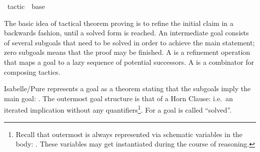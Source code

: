 %
\begin{isabellebody}%
\def\isabellecontext{tactic}%
%
\isadelimtheory
\isanewline
\isanewline
\isanewline
%
\endisadelimtheory
%
\isatagtheory
{}\isamarkupfalse%
\ tactic\ \ base\ %
\endisatagtheory
{\isafoldtheory}%
%
\isadelimtheory
%
\endisadelimtheory
%
\isamarkuptrue%
%
\begin{isamarkuptext}%
The basic idea of tactical theorem proving is to refine the initial
  claim in a backwards fashion, until a solved form is reached.  An
  intermediate goal consists of several subgoals that need to be
  solved in order to achieve the main statement; zero subgoals means
  that the proof may be finished.  A  is a refinement
  operation that maps a goal to a lazy sequence of potential
  successors.  A  is a combinator for composing
  tactics.%
\end{isamarkuptext}%
\isamarkuptrue%
%
\isamarkuptrue%
%
\begin{isamarkuptext}%
Isabelle/Pure represents a goal as a theorem stating that the subgoals imply the main
  goal: .  The outermost goal
  structure is that of a Horn Clause: i.e.\ an iterated implication without any
  quantifiers\footnote{Recall that outermost  is
  always represented via schematic variables in the body: .  These variables may get instantiated during the course of
  reasoning.}.  For  a goal is called ``solved''.


\end{isamarkuptext}
\end{isabellebody}

